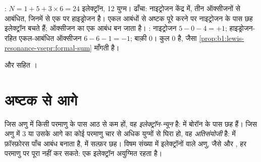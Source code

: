 \begin{example}[नाइट्रिक अम्ल]\label{ex:b1:lewis-resonance-vsepr:hno3}
: $N = 1 + 5 + 3 \times 6 = 24$ इलेक्ट्रॉन, 12 युग्म। ढाँचा:
नाइट्रोजन केंद्र में, तीन ऑक्सीजनों से आबंधित, जिनमें से एक पर
हाइड्रोजन है। एकल आबंधों से अष्टक पूरे करने पर नाइट्रोजन के पास छह
इलेक्ट्रॉन बचते हैं; ऑक्सीजन का एक   आबंध बन जाता है। :
नाइट्रोजन $5 - 0 - 4 = +1$; हाइड्रोजन-रहित एकल-आबंधित ऑक्सीजन
$6 - 6 - 1 = -1$; बाक़ी 0। कुल 0 है, जैसा
\cref{prop:b1:lewis-resonance-vsepr:formal-sum} माँगती है।
\end{example}

\begin{omfigure}

{\small {} और  सहित ।}
\end{omfigure}

\section{अष्टक से आगे}

\begin{definition}[इलेक्ट्रॉन-न्यून और अतिसंयोजी अणु]\label{def:b1:lewis-resonance-vsepr:hypervalent}
जिस अणु में किसी परमाणु के पास आठ से कम  हों, वह
\emph{इलेक्ट्रॉन-न्यून} है:  में बोरॉन
के पास छह हैं। जिस अणु में  3 या उसके आगे का कोई परमाणु चार से अधिक युग्मों से
घिरा हो, वह \emph{अतिसंयोजी} है:
 में फ़ॉस्फ़ोरस पाँच आबंध बनाता है,  में सल्फ़र छह। विषम संख्या
में इलेक्ट्रॉनों वाले अणु, जैसे  और , हर परमाणु पर 
पूरा नहीं कर सकते: एक इलेक्ट्रॉन अयुग्मित रहता है।
\end{definition}

